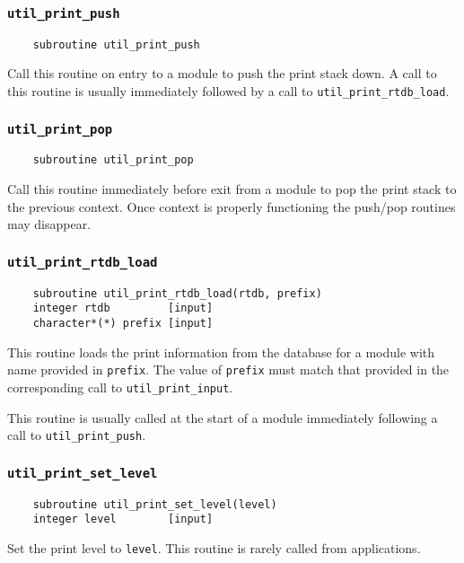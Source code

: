 \subsubsection{{\tt util\_print\_push}}
\begin{verbatim}
    subroutine util_print_push
\end{verbatim}
Call this routine on entry to a module to push the print stack down.
A call to this routine is usually immediately followed by a call to
\verb+util_print_rtdb_load+. 

\subsubsection{{\tt util\_print\_pop}}
\begin{verbatim}
    subroutine util_print_pop
\end{verbatim}
Call this routine immediately before exit from a module to pop the
print stack to the previous context.  Once context is properly
functioning the push/pop routines may disappear.

\subsubsection{{\tt util\_print\_rtdb\_load}}
\begin{verbatim}
    subroutine util_print_rtdb_load(rtdb, prefix)
    integer rtdb         [input]
    character*(*) prefix [input]
\end{verbatim}
This routine loads the print information from the database for a
module with name provided in \verb+prefix+.  The value of
\verb+prefix+ must match that provided in the corresponding call to
\verb+util_print_input+.

This routine is usually called at the start of a module immediately
following a call to \verb+util_print_push+.

\subsubsection{{\tt util\_print\_set\_level}}
\begin{verbatim}
    subroutine util_print_set_level(level)
    integer level        [input]
\end{verbatim}
Set the print level to {\tt level}.  This routine is rarely called
from applications.

